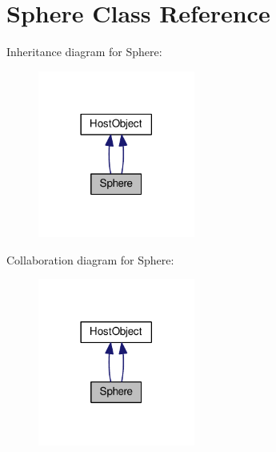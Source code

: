 \hypertarget{class_sphere}{}\section{Sphere Class Reference}
\label{class_sphere}


Inheritance diagram for Sphere\+:
\nopagebreak
\begin{figure}[H]
\begin{center}
\leavevmode
\includegraphics[width=146pt]{class_sphere__inherit__graph}
\end{center}
\end{figure}


Collaboration diagram for Sphere\+:
\nopagebreak
\begin{figure}[H]
\begin{center}
\leavevmode
\includegraphics[width=146pt]{class_sphere__coll__graph}
\end{center}
\end{figure}

